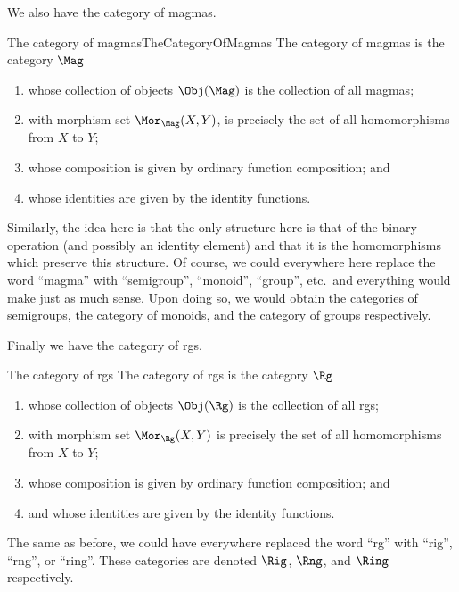 We also have the category of magmas.
\begin{exm}{The category of magmas}{TheCategoryOfMagmas}
The category of magmas is the category $\Mag$\index[notation]{$\Mag$}
\begin{enumerate}
\item whose collection of objects $\Obj (\Mag )$ is the collection of all magmas;
\item with morphism set $\Mor _{\Mag}(X,Y)$, is precisely the set of all homomorphisms from $X$ to $Y$;
\item whose composition is given by ordinary function composition; and
\item whose identities are given by the identity functions.
\end{enumerate}
\end{exm}
Similarly, the idea here is that the only structure here is that of the binary operation (and possibly an identity element) and that it is the homomorphisms which preserve this structure.  Of course, we could everywhere here replace the word ``magma'' with ``semigroup'', ``monoid'', ``group'', etc.~and everything would make just as much sense.  Upon doing so, we would obtain the categories of semigroups, the category of monoids, and the category of groups respectively.

Finally we have the category of rgs.
\begin{exm}{The category of rgs}{}
The category of rgs is the category $\Rg$\index[notation]{$\Rg$}
\begin{enumerate}
\item whose collection of objects $\Obj (\Rg )$ is the collection of all rgs;
\item with morphism set $\Mor _{\Rg}(X,Y)$ is precisely the set of all homomorphisms from $X$ to $Y$;
\item whose composition is given by ordinary function composition; and
\item and whose identities are given by the identity functions.
\end{enumerate}
\begin{rmk}
The same as before, we could have everywhere replaced the word ``rg'' with ``rig'', ``rng'', or ``ring''.  These categories are denoted $\Rig$\index[notation]{$\Rig$}, $\Rng$\index[notation]{$\Rng$}, and $\Ring$\index[notation]{$\Ring$} respectively.
\end{rmk}
\end{exm}

